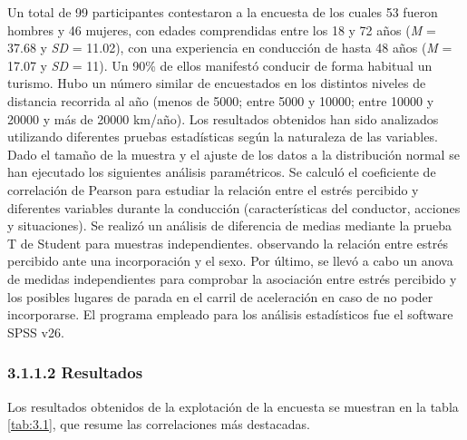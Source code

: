 Un total de 99 participantes contestaron a la encuesta de los cuales 53 fueron hombres y 46 mujeres, con edades comprendidas entre los 18 y 72 años (\emph{M} = 37.68 y \emph{SD} = 11.02), con una experiencia en conducción de hasta 48 años (\emph{M} = 17.07 y \emph{SD} = 11). Un 90\% de ellos manifestó conducir de forma habitual un turismo. Hubo un número similar de encuestados en los distintos niveles de distancia recorrida al año (menos de 5000; entre 5000 y 10000; entre 10000 y 20000 y más de 20000 km/año). 
Los resultados obtenidos han sido analizados utilizando diferentes pruebas estadísticas según la naturaleza de las variables. Dado el tamaño de la muestra y el ajuste de los datos a la distribución normal se han ejecutado los siguientes análisis paramétricos. Se calculó el coeficiente de correlación de Pearson para estudiar la relación entre el estrés percibido y diferentes variables durante la conducción (características del conductor, acciones y situaciones). Se realizó un análisis de diferencia de medias mediante la prueba T de Student para muestras independientes. observando la relación entre estrés percibido ante una incorporación y el sexo. Por último, se llevó a cabo un \gls{anova} de medidas independientes para comprobar la asociación entre estrés percibido y los posibles lugares de parada en el carril de aceleración en caso de no poder incorporarse. El programa empleado para los análisis estadísticos fue el software SPSS v26.

\subsubsection{3.1.1.2 Resultados}\label{3112}

Los resultados obtenidos de la explotación de la encuesta se muestran en la tabla \ref{tab:3.1}, que resume las correlaciones más destacadas.

